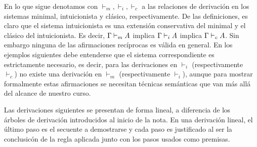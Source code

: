 \documentclass[11pt,letterpaper]{article}
\begin{document}
En lo que sigue denotamos con $\vdash_m,\vdash_i,\vdash_c$ a las
relaciones de derivación en los sistemas minimal, intuicionista y clásico, 
respectivamente.
De las definiciones, es claro que el sistema intuicionista es una
extensión conservativa del minimal y el clásico del intuicionista. Es
decir, $\Gamma\vdash_m A$ implica $\Gamma\vdash_i A$ implica $\Gamma\vdash_c A$. Sin
embargo ninguna de las afirmaciones recíprocas es válida en
general. En los ejemplos siguientes debe entenderse que el sistema
correspondiente es estrictamente necesario, es decir,  para las
derivaciones en $\vdash_i$ (respectivamente $\vdash_c$) no existe una 
derivación en $\vdash_m$ (respectivamente $\vdash_i$), aunque para mostrar 
formalmente estas afirmaciones se necesitan técnicas semánticas que van más
allá del alcance de nuestro curso.

Las derivaciones siguientes se presentan de forma lineal, a diferencia de los 
\'arboles de derivaci\'on introducidos al inicio de la nota.
En una derivaci\'on lineal, el \'ultimo paso es el secuente a demostrarse
y cada paso es justificado al ser la conclusic\'on de la regla aplicada 
junto con los pasos usados como premisas.
\end{document}
